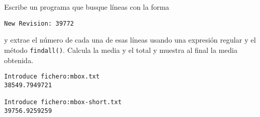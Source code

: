 \begin{ex}
Escribe un programa que busque líneas con la forma

\verb"New Revision: 39772"

y extrae el número de cada una de esas líneas usando una expresión regular
y el método {\tt findall()}. Calcula la media y el total y
muestra al final la media obtenida.

\beforeverb
\begin{verbatim}
Introduce fichero:mbox.txt 
38549.7949721

Introduce fichero:mbox-short.txt
39756.9259259
\end{verbatim}
\afterverb
%

\end{ex}